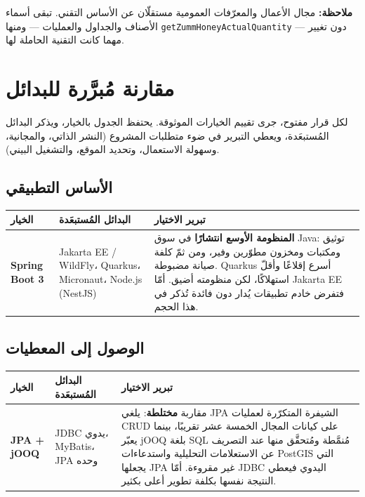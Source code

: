 \begin{encadre}
\textbf{ملاحظة:} مجال الأعمال والمعرّفات العمومية مستقلّان عن الأساس التقني.
تبقى أسماء الأصناف والجداول والعمليات --- ومنها
\texttt{getZummHoneyActualQuantity} --- دون تغيير مهما كانت التقنية الحاملة لها.
\end{encadre}

\section{مقارنة مُبرَّرة للبدائل}
لكل قرار مفتوح، جرى تقييم الخيارات الموثوقة. يحتفظ الجدول بالخيار، ويذكر البدائل
المُستبعَدة، ويعطي التبرير في ضوء متطلبات المشروع (النشر الذاتي، والمجانية،
وسهولة الاستعمال، وتحديد الموقع، والتشغيل البيني).

\subsection{الأساس التطبيقي}
\begin{xltabular}{\textwidth}{>{\bfseries}p{2.7cm} p{4.2cm} X}
\toprule
\textbf{الخيار} & \textbf{البدائل المُستبعَدة} & \textbf{تبرير الاختيار} \\
\midrule
\endhead
Spring Boot 3 & Jakarta EE / WildFly، Quarkus، Micronaut، Node.js (NestJS) & \textbf{المنظومة الأوسع انتشارًا} في سوق Java: توثيق ومكتبات ومخزون مطوّرين وفير، ومن ثمّ كلفة صيانة مضبوطة. Quarkus أسرع إقلاعًا وأقلّ استهلاكًا، لكن منظومته أضيق. أمّا Jakarta EE فتفرض خادم تطبيقات يُدار دون فائدة تُذكر في هذا الحجم. \\
\bottomrule
\end{xltabular}

\subsection{الوصول إلى المعطيات}
\begin{xltabular}{\textwidth}{>{\bfseries}p{2.7cm} p{4.2cm} X}
\toprule
\textbf{الخيار} & \textbf{البدائل المُستبعَدة} & \textbf{تبرير الاختيار} \\
\midrule
\endhead
JPA + jOOQ & JDBC يدوي، MyBatis، JPA وحده & مقاربة \textbf{مختلطة}: يلغي JPA الشيفرة المتكرّرة لعمليات CRUD على كيانات المجال الخمسة عشر تقريبًا، بينما يعبّر jOOQ بلغة SQL مُنمَّطة ومُتحقَّق منها عند التصريف عن الاستعلامات التحليلية واستدعاءات PostGIS التي يجعلها JPA غير مقروءة. أمّا JDBC اليدوي فيعطي النتيجة نفسها بكلفة تطوير أعلى بكثير. \\
\bottomrule
\end{xltabular}

